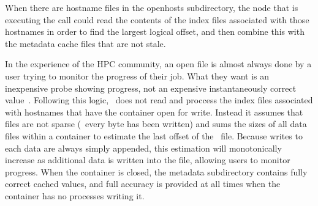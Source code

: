 When there are hostname files in the openhosts subdirectory, the node that is
executing the  call could read the contents of the index files
associated with those hostnames in order to find the largest logical offset,
and then combine this with the metadata cache files that are not stale.

In the experience of the HPC community,  an open file is
almost always done by a user trying to monitor the progress of their job. What
they want is an inexpensive probe showing progress, not an expensive
instantaneously correct value~\cite{hec-posix}. Following this logic, \plfs\
does not read and proccess the index files associated with hostnames that have
the container open for write. Instead it assumes that files are not sparse
(\ie\ every byte has been written) and sums the sizes of all data files within
a container to estimate the last offset of the \plfs\ file.  Because writes to
each data are always simply appended, this estimation will monotonically
increase as additional data is written into the file, allowing users to monitor
progress. When the container is closed, the metadata subdirectory contains
fully correct cached values, and full accuracy is provided at all times when
the container has no processes writing it.

